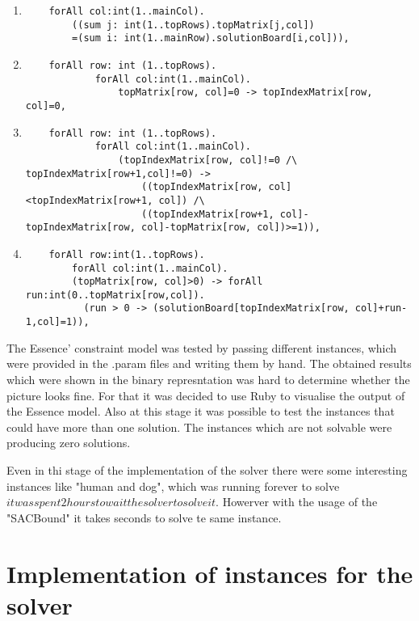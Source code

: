 \begin{enumerate}	
	\item %
	\begin{verbatim}
	forAll col:int(1..mainCol).
		((sum j: int(1..topRows).topMatrix[j,col])
		=(sum i: int(1..mainRow).solutionBoard[i,col])),
	\end{verbatim}

	\item %
	\begin{verbatim}
	forAll row: int (1..topRows).
			forAll col:int(1..mainCol).
				topMatrix[row, col]=0 -> topIndexMatrix[row, col]=0,
	\end{verbatim}

	\item %
	\begin{verbatim}
	forAll row: int (1..topRows).
			forAll col:int(1..mainCol).
				(topIndexMatrix[row, col]!=0 /\ topIndexMatrix[row+1,col]!=0) ->
					((topIndexMatrix[row, col]<topIndexMatrix[row+1, col]) /\
					((topIndexMatrix[row+1, col]-topIndexMatrix[row, col]-topMatrix[row, col])>=1)),
	\end{verbatim}

	\item %
	\begin{verbatim}
	forAll row:int(1..topRows).
		forAll col:int(1..mainCol).
	    (topMatrix[row, col]>0) -> forAll run:int(0..topMatrix[row,col]).
	      (run > 0 -> (solutionBoard[topIndexMatrix[row, col]+run-1,col]=1)),
	\end{verbatim}
\end{enumerate}

The Essence' constraint model was tested by passing different instances, which were provided in the .param files and writing them by hand.
The obtained results which were shown in the binary represntation was hard to determine whether the picture looks fine. For that it was decided to use Ruby to visualise the output of the Essence model. Also at this stage it was possible to test the instances that could have more than one solution. The instances which are not solvable were producing zero solutions. 

Even in thi stage of the implementation of the solver there were some interesting instances like "human and dog", which was running forever to solve \(it was spent 2 hours to wait the solver to solve it\). Howerver with the usage of the "SACBound" it takes seconds to solve te same instance. 

\section{Implementation of instances for the solver}
\label{sec:imeplementationInstances}


